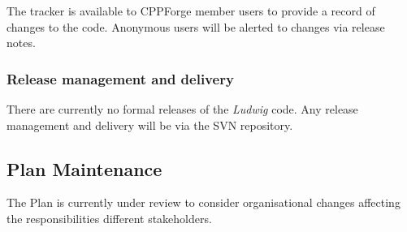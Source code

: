 The tracker is available to CPPForge member users to provide a record
of changes to the code. Anonymous users will be alerted to changes via
release notes.





\subsubsection{Release management and delivery}

There are currently no formal releases of the \textit{Ludwig} code.
Any release management and  delivery will be via the SVN repository.





\subsection{Plan Maintenance}

The Plan is currently under review to consider organisational changes
affecting the responsibilities different stakeholders.




